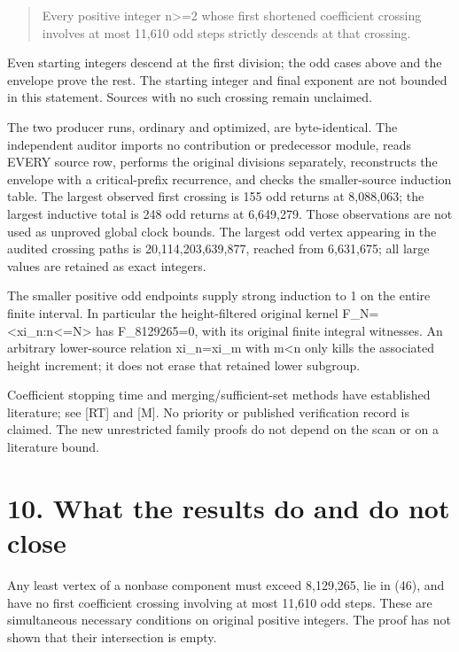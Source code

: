 \begin{quote}
Every positive integer n\textgreater=2 whose first shortened coefficient
crossing involves at most 11,610 odd steps strictly descends at that
crossing.
\end{quote}

Even starting integers descend at the first division; the odd cases
above and the envelope prove the rest. The starting integer and final
exponent are not bounded in this statement. Sources with no such
crossing remain unclaimed.

The two producer runs, ordinary and optimized, are byte-identical. The
independent auditor imports no contribution or predecessor module, reads
EVERY source row, performs the original divisions separately,
reconstructs the envelope with a critical-prefix recurrence, and checks
the smaller-source induction table. The largest observed first crossing
is 155 odd returns at 8,088,063; the largest inductive total is 248 odd
returns at 6,649,279. Those observations are not used as unproved global
clock bounds. The largest odd vertex appearing in the audited crossing
paths is 20,114,203,639,877, reached from 6,631,675; all large values
are retained as exact integers.

The smaller positive odd endpoints supply strong induction to 1 on the
entire finite interval. In particular the height-filtered original
kernel F\_N=\textless xi\_n:n\textless=N\textgreater{} has F\_8129265=0,
with its original finite integral witnesses. An arbitrary lower-source
relation xi\_n=xi\_m with m\textless n only kills the associated height
increment; it does not erase that retained lower subgroup.

Coefficient stopping time and merging/sufficient-set methods have
established literature; see {[}RT{]} and {[}M{]}. No priority or
published verification record is claimed. The new unrestricted family
proofs do not depend on the scan or on a literature bound.

\section{10. What the results do and do not close}

Any least vertex of a nonbase component must exceed 8,129,265, lie in
(46), and have no first coefficient crossing involving at most 11,610
odd steps. These are simultaneous necessary conditions on original
positive integers. The proof has not shown that their intersection is
empty.


